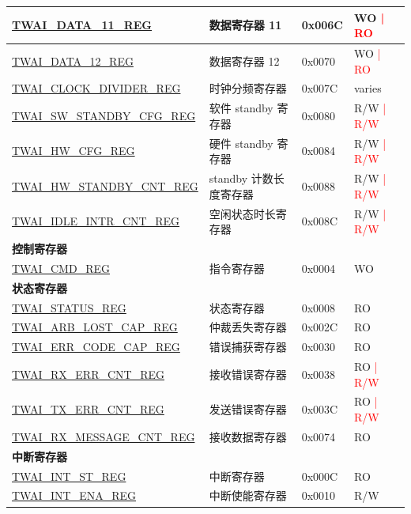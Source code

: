 \begin{longtable}{ | p{6cm} | p{6cm} | p{1.3cm} | p{2cm} | }
\hyperref[regdesc:TWAIDATA11REG]{TWAI\_DATA\_11\_REG} & 数据寄存器 11 & 0x006C & WO \textcolor{red}{| RO} \\ \hline
\hyperref[regdesc:TWAIDATA12REG]{TWAI\_DATA\_12\_REG} & 数据寄存器 12 & 0x0070 & WO \textcolor{red}{| RO} \\ \hline
\hyperref[regdesc:TWAICLOCKDIVIDERREG]{TWAI\_CLOCK\_DIVIDER\_REG} & 时钟分频寄存器 & 0x007C & varies \\ \hline
\hyperref[regdesc:TWAISWSTANDBYCFGREG]{TWAI\_SW\_STANDBY\_CFG\_REG} & 软件 standby 寄存器 & 0x0080 & R/W \textcolor{red}{| R/W} \\ \hline
\hyperref[regdesc:TWAIHWCFGREG]{TWAI\_HW\_CFG\_REG} & 硬件 standby 寄存器 & 0x0084 & R/W \textcolor{red}{| R/W} \\ \hline
\hyperref[regdesc:TWAIHWSTANDBYCNTREG]{TWAI\_HW\_STANDBY\_CNT\_REG} &  standby 计数长度寄存器 & 0x0088 & R/W \textcolor{red}{| R/W} \\ \hline
\hyperref[regdesc:TWAIIDLEINTRCNTREG]{TWAI\_IDLE\_INTR\_CNT\_REG} & 空闲状态时长寄存器 & 0x008C & R/W \textcolor{red}{| R/W} \\ \hline
\multicolumn{4}{|l|}{\textbf{控制寄存器}} \\ \hline
\hyperref[regdesc:TWAICMDREG]{TWAI\_CMD\_REG} & 指令寄存器 & 0x0004 & WO \\ \hline
\multicolumn{4}{|l|}{\textbf{状态寄存器}} \\ \hline
\hyperref[regdesc:TWAISTATUSREG]{TWAI\_STATUS\_REG} & 状态寄存器 & 0x0008 & RO \\ \hline
\hyperref[regdesc:TWAIARBLOSTCAPREG]{TWAI\_ARB\_LOST\_CAP\_REG} & 仲裁丢失寄存器 & 0x002C & RO \\ \hline
\hyperref[regdesc:TWAIERRCODECAPREG]{TWAI\_ERR\_CODE\_CAP\_REG} & 错误捕获寄存器 & 0x0030 & RO \\ \hline
\hyperref[regdesc:TWAIRXERRCNTREG]{TWAI\_RX\_ERR\_CNT\_REG} & 接收错误寄存器 & 0x0038 & RO \textcolor{red}{| R/W} \\ \hline
\hyperref[regdesc:TWAITXERRCNTREG]{TWAI\_TX\_ERR\_CNT\_REG} & 发送错误寄存器 & 0x003C & RO \textcolor{red}{| R/W} \\ \hline
\hyperref[regdesc:TWAIRXMESSAGECNTREG]{TWAI\_RX\_MESSAGE\_CNT\_REG} & 接收数据寄存器 & 0x0074 & RO \\ \hline
\multicolumn{4}{|l|}{\textbf{中断寄存器}} \\ \hline
\hyperref[regdesc:TWAIINTSTREG]{TWAI\_INT\_ST\_REG} & 中断寄存器 & 0x000C & RO \\ \hline
\hyperref[regdesc:TWAIINTENAREG]{TWAI\_INT\_ENA\_REG} & 中断使能寄存器 & 0x0010 & R/W \\ \hline
\end{longtable}
